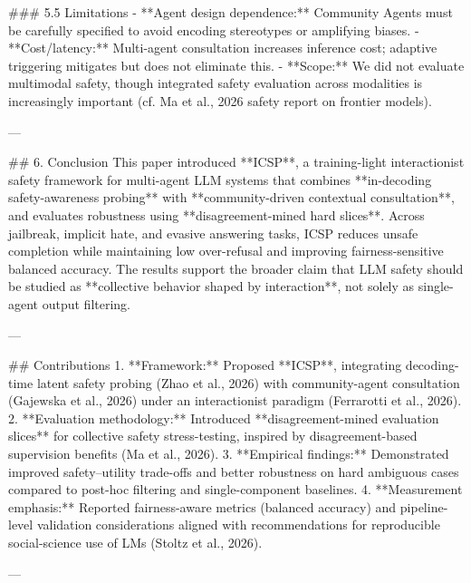 ### 5.5 Limitations  
- **Agent design dependence:** Community Agents must be carefully specified to avoid encoding stereotypes or amplifying biases.  
- **Cost/latency:** Multi-agent consultation increases inference cost; adaptive triggering mitigates but does not eliminate this.  
- **Scope:** We did not evaluate multimodal safety, though integrated safety evaluation across modalities is increasingly important (cf. Ma et al., 2026 safety report on frontier models).

---

## 6. Conclusion  
This paper introduced **ICSP**, a training-light interactionist safety framework for multi-agent LLM systems that combines **in-decoding safety-awareness probing** with **community-driven contextual consultation**, and evaluates robustness using **disagreement-mined hard slices**. Across jailbreak, implicit hate, and evasive answering tasks, ICSP reduces unsafe completion while maintaining low over-refusal and improving fairness-sensitive balanced accuracy. The results support the broader claim that LLM safety should be studied as **collective behavior shaped by interaction**, not solely as single-agent output filtering.

---

## Contributions  
1. **Framework:** Proposed **ICSP**, integrating decoding-time latent safety probing (Zhao et al., 2026) with community-agent consultation (Gajewska et al., 2026) under an interactionist paradigm (Ferrarotti et al., 2026).  
2. **Evaluation methodology:** Introduced **disagreement-mined evaluation slices** for collective safety stress-testing, inspired by disagreement-based supervision benefits (Ma et al., 2026).  
3. **Empirical findings:** Demonstrated improved safety–utility trade-offs and better robustness on hard ambiguous cases compared to post-hoc filtering and single-component baselines.  
4. **Measurement emphasis:** Reported fairness-aware metrics (balanced accuracy) and pipeline-level validation considerations aligned with recommendations for reproducible social-science use of LMs (Stoltz et al., 2026).

---